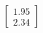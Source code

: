 \documentclass[preview]{standalone}
\begin{document}
\begin{align*}
\begin{bmatrix} 1.95 \\ 2.34 \end{bmatrix}
\end{align*}
\end{document}
